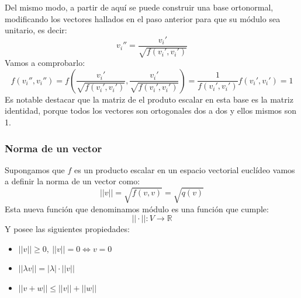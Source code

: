 \documentclass[10pt,a4paper,openright]{book}
\theoremstyle{break}
\begin{document}
Del mismo modo, a partir de aquí se puede construir una base ortonormal, modificando los vectores hallados en el paso anterior para que su módulo sea unitario, es decir:
$$v_i''= \frac{v_i'}{\sqrt{f(v_i',v_i')}}$$
Vamos a comprobarlo:
$$f(v_i'', v_i'')=f\left(\frac{v_i'}{\sqrt{f(v_i',v_i')}},\frac{v_i'}{\sqrt{f(v_i',v_i')}}\right) = \frac{1}{f(v_i',v_i')}f(v_i',v_i') = 1$$
Es notable destacar que la matriz de el produto escalar en esta base es la matriz identidad, porque todos los vectores son ortogonales dos a dos y ellos mismos son 1.

\subsubsection*{Norma de un vector}
Supongamos que $f$ es un producto escalar en un espacio vectorial euclídeo vamos a definir la norma de un vector como:
$$||v|| = \sqrt{f(v,v)} =\sqrt{q(v)}$$
Esta nueva función que denominamos módulo es una función que cumple:
$$||\cdot||: V\rightarrow \mathbb R$$
Y posee las siguientes propiedades:
\begin{itemize}
\item $||v||\geq 0, \ ||v||=0\Leftrightarrow v=0$
\item $||\lambda v|| = |\lambda|\cdot ||v||$
\item $||v+w||\leq ||v||+||w||$
\end{itemize}
\end{document}
